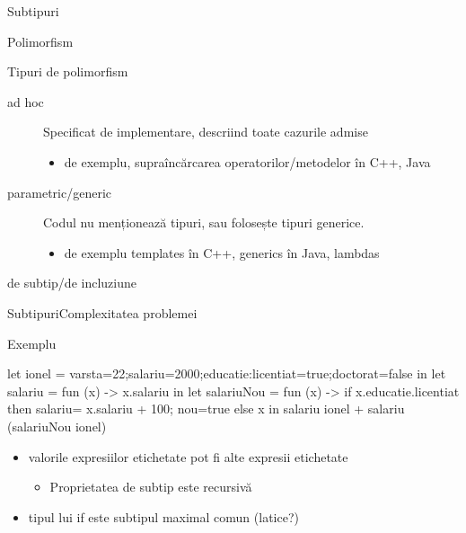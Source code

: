 \documentclass[xcolor=pdftex,romanian,colorlinks]{beamer}
\begin{document}
\begin{section}{Subtipuri}
\begin{frame}{Polimorfism}
\begin{block}{Tipuri de polimorfism}
 \begin{description}
   \item[ad hoc] Specificat de implementare, descriind toate cazurile admise
     \begin{itemize}
       \item de exemplu, supraîncărcarea operatorilor/metodelor în C++, Java
     \end{itemize}
   \item[parametric/generic] Codul nu menționează tipuri, sau folosește tipuri generice.
     \begin{itemize}
       \item de exemplu templates în C++, generics în Java, lambdas
     \end{itemize}
  \item[de subtip/de incluziune] 
 \end{description}
\end{block}
\end{frame}

\begin{frame}[fragile]{Subtipuri}{Complexitatea problemei}
\begin{block}{Exemplu}
\begin{asciiml}
let ionel = {varsta=22;salariu=2000;educatie:{licentiat=true;doctorat=false}} in
let salariu = fun (x) -> x.salariu in
let salariuNou = fun (x) 
   -> if x.educatie.licentiat then {salariu= x.salariu + 100; nou=true}
                              else x
in salariu ionel + salariu (salariuNou ionel)
\end{asciiml}

\end{block}
\vfill
\begin{itemize}
\item valorile expresiilor etichetate pot fi alte expresii etichetate
  \begin{itemize}
    \item Proprietatea de subtip este recursivă
  \end{itemize}
\item tipul lui if este subtipul maximal comun (latice?) 
\end{itemize}
\end{frame}


\end{section}
\end{document}
